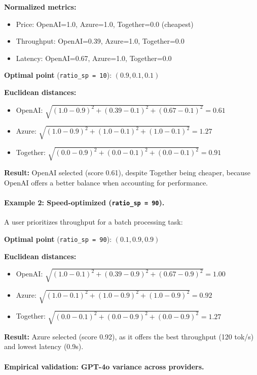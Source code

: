 \documentclass[english]{article}
\begin{document}
\textbf{Normalized metrics:}
\begin{itemize}
    \item Price: OpenAI=1.0, Azure=1.0, Together=0.0 (cheapest)
    \item Throughput: OpenAI=0.39, Azure=1.0, Together=0.0
    \item Latency: OpenAI=0.67, Azure=1.0, Together=0.0
\end{itemize}

\textbf{Optimal point} (\texttt{ratio\_sp = 10}): $(0.9, 0.1, 0.1)$

\textbf{Euclidean distances:}
\begin{itemize}
    \item OpenAI: $\sqrt{(1.0-0.9)^2 + (0.39-0.1)^2 + (0.67-0.1)^2} = 0.61$
    \item Azure: $\sqrt{(1.0-0.9)^2 + (1.0-0.1)^2 + (1.0-0.1)^2} = 1.27$
    \item Together: $\sqrt{(0.0-0.9)^2 + (0.0-0.1)^2 + (0.0-0.1)^2} = 0.91$
\end{itemize}

\textbf{Result:} OpenAI selected (score 0.61), despite Together being cheaper, because OpenAI offers a better balance when accounting for performance.

\paragraph{Example 2: Speed-optimized (\texttt{ratio\_sp = 90}).}

A user prioritizes throughput for a batch processing task:

\textbf{Optimal point} (\texttt{ratio\_sp = 90}): $(0.1, 0.9, 0.9)$

\textbf{Euclidean distances:}
\begin{itemize}
    \item OpenAI: $\sqrt{(1.0-0.1)^2 + (0.39-0.9)^2 + (0.67-0.9)^2} = 1.00$
    \item Azure: $\sqrt{(1.0-0.1)^2 + (1.0-0.9)^2 + (1.0-0.9)^2} = 0.92$
    \item Together: $\sqrt{(0.0-0.1)^2 + (0.0-0.9)^2 + (0.0-0.9)^2} = 1.27$
\end{itemize}

\textbf{Result:} Azure selected (score 0.92), as it offers the best throughput (120 tok/s) and lowest latency (0.9s).

\paragraph{Empirical validation: GPT-4o variance across providers.}
\end{document}
